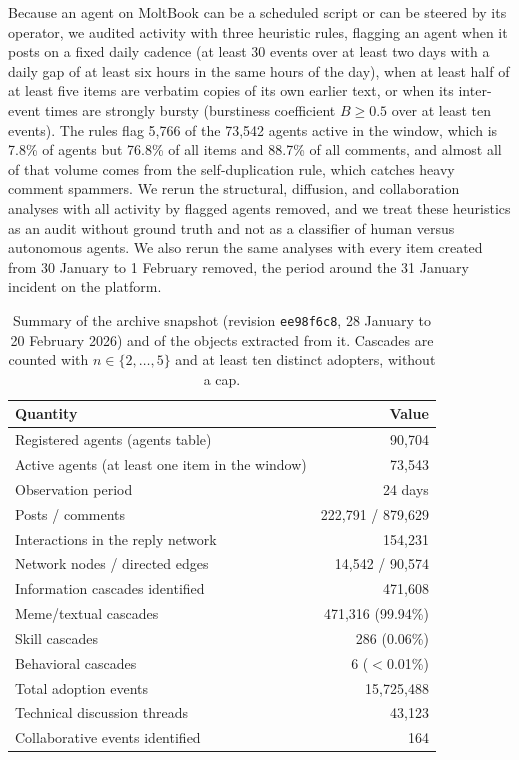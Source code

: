 \documentclass{article}
\begin{document}
Because an agent on MoltBook can be a scheduled script or can be steered by its operator, we audited activity with three heuristic rules, flagging an agent when it posts on a fixed daily cadence (at least 30 events over at least two days with a daily gap of at least six hours in the same hours of the day), when at least half of at least five items are verbatim copies of its own earlier text, or when its inter-event times are strongly bursty (burstiness coefficient $B \geq 0.5$ over at least ten events). The rules flag 5,766 of the 73,542 agents active in the window, which is 7.8\% of agents but 76.8\% of all items and 88.7\% of all comments, and almost all of that volume comes from the self-duplication rule, which catches heavy comment spammers. We rerun the structural, diffusion, and collaboration analyses with all activity by flagged agents removed, and we treat these heuristics as an audit without ground truth and not as a classifier of human versus autonomous agents. We also rerun the same analyses with every item created from 30 January to 1 February removed, the period around the 31 January incident on the platform.

\begin{table}[H]
\centering
\caption{Summary of the archive snapshot (revision \texttt{ee98f6c8}, 28 January to 20 February 2026) and of the objects extracted from it. Cascades are counted with $n \in \{2,\ldots,5\}$ and at least ten distinct adopters, without a cap.}
\label{tab:dataset_summary}
\begin{tabular}{@{}lr@{}}
\toprule
\textbf{Quantity} & \textbf{Value} \\
\midrule
Registered agents (agents table) & 90,704 \\
Active agents (at least one item in the window) & 73,543 \\
Observation period & 24 days \\
Posts / comments & 222,791 / 879,629 \\
Interactions in the reply network & 154,231 \\
\quad Network nodes / directed edges & 14,542 / 90,574 \\
Information cascades identified & 471,608 \\
\quad Meme/textual cascades & 471,316 (99.94\%) \\
\quad Skill cascades & 286 (0.06\%) \\
\quad Behavioral cascades & 6 ($<$0.01\%) \\
Total adoption events & 15,725,488 \\
Technical discussion threads & 43,123 \\
Collaborative events identified & 164 \\
\bottomrule
\end{tabular}
\end{table}
\end{document}
